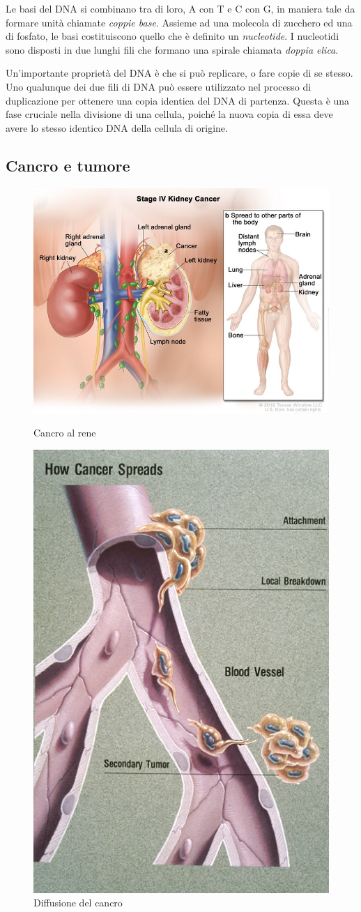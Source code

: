 Le basi del DNA si combinano tra di loro, A con T e C con G, in maniera tale da formare unità chiamate \textit{coppie base}. Assieme ad una molecola di zucchero ed una di fosfato, le basi costituiscono quello che è definito un \textit{nucleotide}. I nucleotidi sono disposti in due lunghi fili che formano una spirale chiamata \textit{doppia elica}.

Un'importante proprietà del DNA è che si può replicare, o fare copie di se stesso. Uno qualunque dei due fili di DNA \cite{WhatisDN79:online} può essere utilizzato nel processo di duplicazione per ottenere una copia identica del DNA di partenza. Questa è una fase cruciale nella divisione di una cellula, poiché la nuova copia di essa deve avere lo stesso identico DNA della cellula di origine.

\subsection{Cancro e tumore}
\label{chap:intro-biology-cancer}

\begin{figure}[h]
    \begin{minipage}{.5 \textwidth}
        \centering
        \includegraphics[width=0.75 \textwidth]{Images/1_tumor.jpg}
        \caption{\small Cancro al rene}
        \label{fig:kidney-cancer}
    \end{minipage}%
    \begin{minipage}{.5 \textwidth}
        \centering
        \includegraphics[width=0.35 \textwidth]{./Images/1_metastasi_spread.jpg}
        \caption{\small Diffusione del cancro}
        \label{fig:metastasi}
    \end{minipage}
\end{figure}

